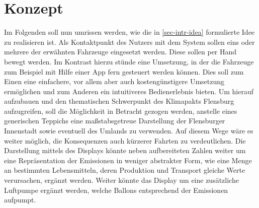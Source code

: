 \documentclass[.../Dokumentation.tex]{subfiles}
\begin{document}
\section{Konzept}\label{sec-concept}
Im Folgenden soll nun umrissen werden, wie die in \ref{sec-intr-idea} 
formulierte Idee zu realisieren ist.
Als Kontaktpunkt des Nutzers mit dem System sollen eins oder mehrere 
der erwähnten Fahrzeuge eingesetzt werden. Diese sollen per Hand bewegt werden. 
Im Kontrast hierzu stünde eine Umsetzung, in der die Fahrzeuge zum Beispiel mit 
Hilfe einer App fern gesteuert werden können.
Dies soll zum Einen eine einfachere, vor allem aber auch kostengünstigere 
Umsetzung ermöglichen und zum Anderen ein intuitiveres Bedienerlebnis bieten.
Um hierauf aufzubauen und den thematischen Schwerpunkt des Klimapakts Flensburg 
aufzugreifen, soll die Möglichkeit in Betracht gezogen werden, anstelle 
eines generischen Teppichs eine maßstabsgetreue Darstellung der Flensburger 
Innenstadt sowie eventuell des Umlands zu verwenden.
Auf diesem Wege wäre es weiter möglich, die Konsequenzen auch kürzerer Fahrten 
zu verdeutlichen.
Die Darstellung mittels des Displays könnte neben aufbereiteten Zahlen weiter 
um eine Repräsentation der Emissionen in weniger abstrakter Form, wie eine 
Menge an bestimmten Lebensmitteln, deren Produktion und Transport gleiche Werte 
verursachen, ergänzt werden.
Weiter könnte das Display um eine zusätzliche Luftpumpe ergänzt werden, 
welche Ballons entsprechend der Emissionen aufpumpt.
\end{document}
